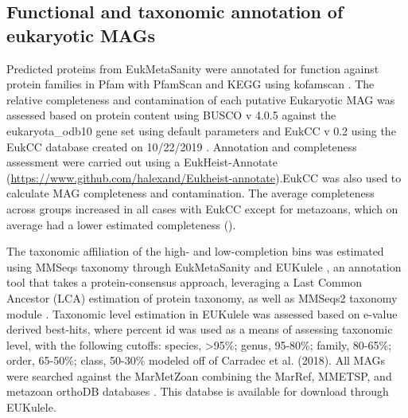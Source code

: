 \documentclass[12pt]{article}
\numberwithin{equation}{section}
\begin{document}
\subsection*{Functional and taxonomic annotation of eukaryotic MAGs} 

Predicted proteins from EukMetaSanity were annotated for function against protein families in Pfam with PfamScan \citep{Finn2014Pfam} and KEGG using kofamscan \citep{Kanehisa_2019, Aramaki_2019}. The relative completeness and contamination  of each putative Eukaryotic MAG was assessed based on protein content using BUSCO v 4.0.5 against the eukaryota\_odb10 gene set using default parameters \citep{Simao2015BUSCO} and EukCC v 0.2 using the EukCC database created on 10/22/2019 \citep{Saary2020Estimating}. Annotation and completeness assessment were carried out using a EukHeist-Annotate (\url{https://www.github.com/halexand/Eukheist-annotate}).EukCC \citep{Saary2020Estimating} was also used to calculate MAG completeness and contamination. The average completeness across groups increased in all cases with EukCC except for metazoans, which on average had a lower estimated completeness (). 

The taxonomic affiliation of the high- and low-completion bins was estimated using MMSeqs taxonomy through EukMetaSanity and EUKulele \citep{Krinos2021EUKulele}, an annotation tool that takes a protein-consensus approach, leveraging a Last Common Ancestor (LCA) estimation of protein taxonomy, as well as MMSeqs2 taxonomy module \citep{Steinegger2017, Steinegger2018, Mirdita2019}. Taxonomic level estimation in EUKulele was assessed based on e-value derived best-hits, where percent id was used as a means of assessing taxonomic level, with the following cutoffs: species, >95\%; genus, 95-80\%; family, 80-65\%; order, 65-50\%; class, 50-30\% modeled off of Carradec et al. (2018). All MAGs were searched against the MarMetZoan combining the MarRef, MMETSP, and metazoan orthoDB databases \citep{Johnson2018Re-assembly, Keeling2014, Kriventseva2018, Klemetsen:2017fg}. This databse is available for download through EUKulele. 
\end{document}
